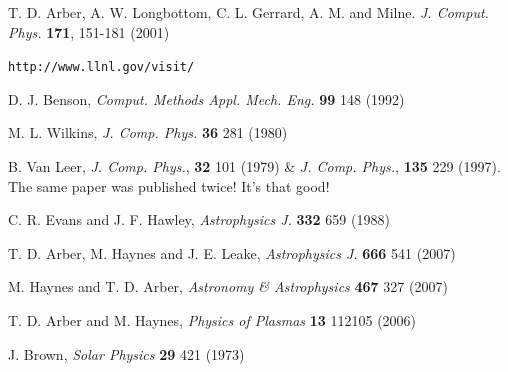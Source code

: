 \documentclass[11pt]{article}
\begin{document}
\newpage
\begin{thebibliography}{}

 T. D. Arber, A. W. Longbottom, C. L. Gerrard, A. M. and Milne. \textit{J. Comput. Phys.} \textbf{171}, 151-181 (2001)

 {\tt http://www.llnl.gov/visit/}

 D. J. Benson, \textit{Comput. Methods Appl. Mech. Eng.} \textbf{99} 148 (1992) 

 M. L. Wilkins, \textit{J. Comp. Phys.} \textbf{36} 281 (1980)

 B. Van Leer, \textit{J. Comp. Phys.}, \textbf{32} 101 (1979)  \& \textit{J. Comp. Phys.}, \textbf{135} 229 (1997). The same paper was published twice! It's that good!

 C. R. Evans and J. F. Hawley, \textit{Astrophysics J.} \textbf{332} 659 (1988) 

 T. D. Arber, M. Haynes and J. E. Leake, {\it Astrophysics J.} \textbf{666} 541 (2007)

 M. Haynes and T. D. Arber, \textit{Astronomy \& Astrophysics } \textbf{467} 327 (2007)

 T. D. Arber and M. Haynes, \textit{Physics of Plasmas} \textbf{13} 112105 (2006)

 J. Brown, \textit{Solar Physics} \textbf{29} 421 (1973)

\end{thebibliography}
\end{document}
